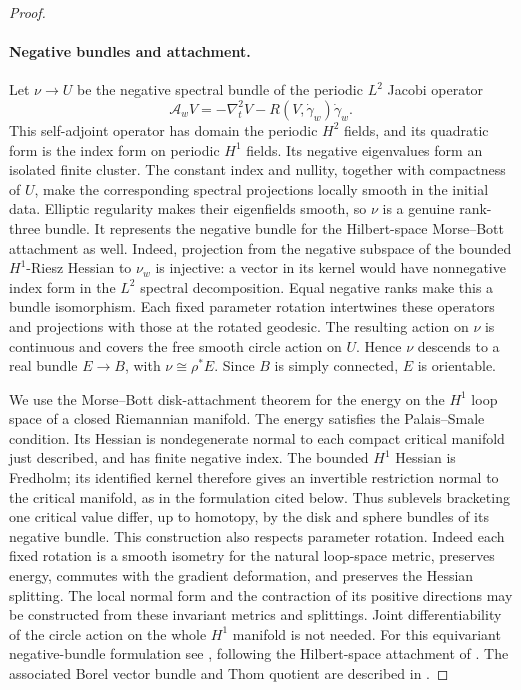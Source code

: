 \begin{proof}
\paragraph{Negative bundles and attachment.}
Let $\nu\to U$ be the negative spectral bundle of the periodic
$L^2$ Jacobi operator
\[
 \mathscr A_w V=-\nabla_t^2V-R(V,\dot\gamma_w)\dot\gamma_w.
\]
This self-adjoint operator has domain the periodic $H^2$ fields,
and its quadratic form is the index form on periodic $H^1$ fields.
Its negative eigenvalues form an isolated finite cluster. The
constant index and nullity, together with compactness of $U$,
make the corresponding spectral projections locally smooth in
the initial data. Elliptic regularity makes their eigenfields
smooth, so $\nu$ is a genuine rank-three bundle.
It represents the negative bundle for the Hilbert-space
Morse--Bott attachment as well. Indeed, projection from the
negative subspace of the bounded $H^1$-Riesz Hessian to $\nu_w$
is injective: a vector in its kernel would have nonnegative
index form in the $L^2$ spectral decomposition. Equal negative
ranks make this a bundle isomorphism.
Each fixed parameter rotation intertwines these operators and
projections with those at the rotated geodesic. The resulting
action on $\nu$ is continuous and covers the free smooth circle
action on $U$. Hence $\nu$ descends to a real bundle $E\to B$,
with $\nu\cong\rho^*E$. Since $B$ is simply connected, $E$ is
orientable.

We use the Morse--Bott disk-attachment theorem for the energy on
the $H^1$ loop space of a closed Riemannian manifold.  The energy
satisfies the Palais--Smale condition.  Its Hessian is nondegenerate
normal to each compact critical manifold just described, and has
finite negative index. The bounded $H^1$ Hessian is Fredholm;
its identified kernel therefore gives an invertible restriction
normal to the critical manifold, as in the formulation cited
below. Thus sublevels bracketing one critical
value differ, up to homotopy, by the disk and sphere bundles of
its negative bundle.  This construction also respects parameter
rotation.  Indeed each fixed rotation is a smooth isometry for
the natural loop-space metric, preserves energy, commutes with
the gradient deformation, and preserves the Hessian splitting.
The local normal form and the contraction of its positive
directions may be constructed from these invariant metrics and
splittings.  Joint differentiability of the circle action on the
whole $H^1$ manifold is not needed.  For this equivariant
negative-bundle formulation see \citet[Section~7, pp.~2190--2192]
{OttosenBokstedt2007}, following the Hilbert-space attachment of
\citet[Theorem~2.4.10]{Klingenberg1978}.
The associated Borel vector bundle and Thom quotient are described
in \citet[Lemma~5.1, pp.~2185--2186]{OttosenBokstedt2007}.


\end{proof}
